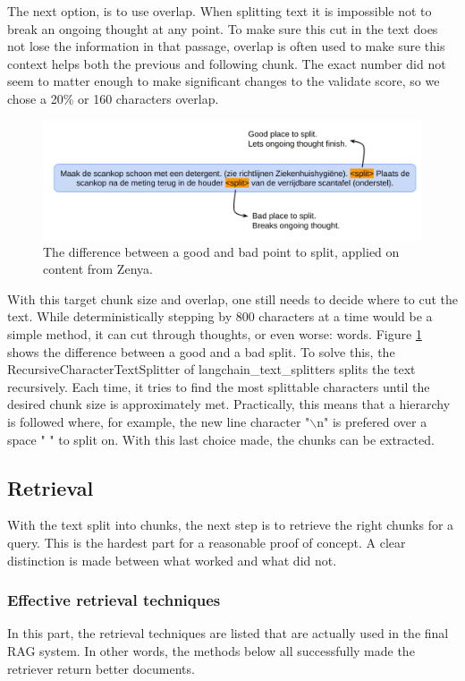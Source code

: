 The next option, is to use overlap. When splitting text it is impossible not to break an ongoing thought at any point. To make sure this cut in the text does not lose the information in that passage, overlap is often used to make sure this context helps both the previous and following chunk. The exact number did not seem to matter enough to make significant changes to the validate score, so we chose a 20\% or 160 characters overlap.

\begin{figure}[h]
    \captionsetup{justification=centering}
    \centerline{\includegraphics[width=1\linewidth]{fig/good_split_bad_split.png}}
    \caption{The difference between a good and bad point to split, applied on content from Zenya.}
    \label{fig:good_split_bad_split}
\end{figure}

With this target chunk size and overlap, one still needs to decide where to cut the text. While deterministically stepping by 800 characters at a time would be a simple method, it can cut through thoughts, or even worse: words. Figure \ref{fig:good_split_bad_split} shows the difference between a good and a bad split. To solve this, the RecursiveCharacterTextSplitter of langchain\_text\_splitters splits the text recursively. Each time, it tries to find the most splittable characters until the desired chunk size is approximately met. Practically, this means that a hierarchy is followed where, for example, the new line character "$\backslash$n" is prefered over a space " " to split on. With this last choice made, the chunks can be extracted.

\subsection{Retrieval}
With the text split into chunks, the next step is to retrieve the right chunks for a query. This is the hardest part for a reasonable proof of concept. A clear distinction is made between what worked and what did not.

\subsubsection{Effective retrieval techniques}
In this part, the retrieval techniques are listed that are actually used in the final RAG system. In other words, the methods below all successfully made the retriever return better documents.

